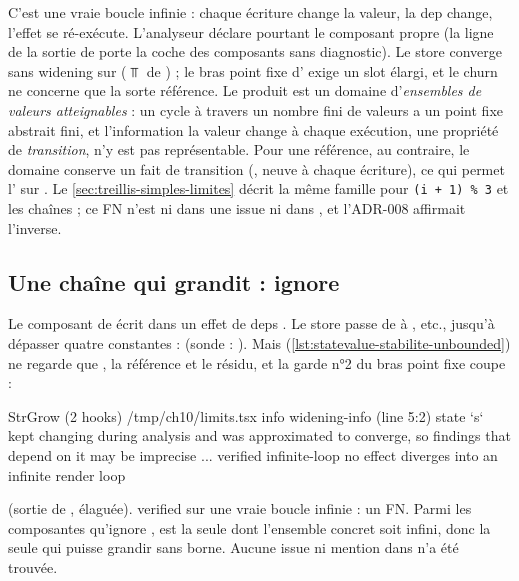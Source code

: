 C'est une vraie boucle infinie : chaque écriture change la valeur, la dep
change, l'effet se ré-exécute. L'analyseur déclare pourtant le composant
propre (la ligne  de la sortie de 
porte la coche des composants sans diagnostic). Le store converge sans widening sur 
($\Top$ de ) ; le bras point fixe d' exige
un slot élargi, et le churn ne concerne que la sorte référence. Le produit
est un domaine d'\emph{ensembles de valeurs atteignables} : un cycle à
travers un nombre fini de valeurs a un point fixe abstrait fini, et
l'information \og la valeur change à chaque exécution\fg{}, une propriété de
\emph{transition}, n'y est pas représentable. Pour une référence, au
contraire, le domaine conserve un fait de transition (,
\og neuve à chaque écriture\fg{}), ce qui permet l'\Error{} sur
. Le \cref{sec:treillis-simples-limites} décrit la même
famille pour \texttt{(i + 1) \% 3} et les chaînes ; ce FN n'est ni dans une
issue ni dans , et l'ADR-008 affirmait l'inverse.

\subsection{Une chaîne qui grandit :  ignore }

Le composant  de  écrit
 dans un effet de deps \code{[s]}. Le store passe de
 à , etc., jusqu'à dépasser quatre
constantes :  (sonde : ). Mais 
(\cref{lst:statevalue-stabilite-unbounded}) ne regarde que , la
référence et le résidu, et la garde n°2 du bras point fixe coupe :
\begin{sortie}
  StrGrow  (2 hooks)  /tmp/ch10/limits.tsx
    info   widening-info  (line 5:2)  state `s` kept changing during analysis and was approximated to converge, so findings that depend on it may be imprecise
    ...
    verified  infinite-loop  no effect diverges into an infinite render loop
\end{sortie}
(sortie de , élaguée). \og verified\fg{}
sur une vraie boucle infinie : un FN. Parmi les composantes qu'ignore
,  est la seule dont l'ensemble concret soit
infini, donc la seule qui puisse grandir sans borne. Aucune issue ni
mention dans  n'a été trouvée.

